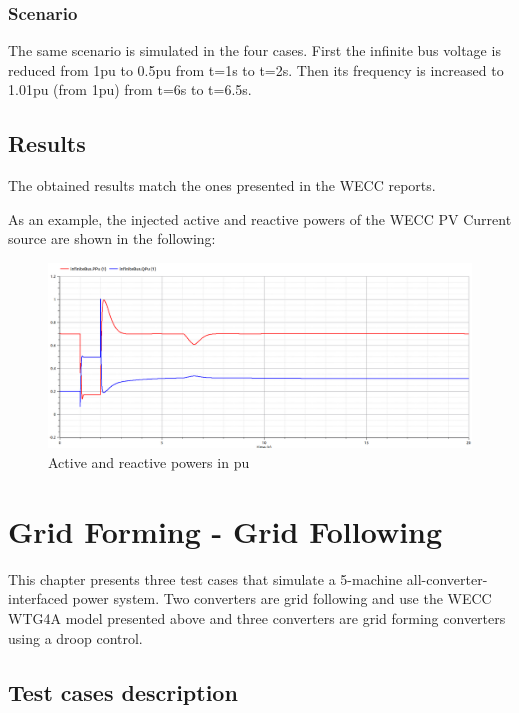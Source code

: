 \documentclass[a4paper, 12pt]{report}
\begin{document}
\subsection{Scenario}

\par The same scenario is simulated in the four cases. First the infinite bus voltage is reduced from 1pu to 0.5pu from t=1s to t=2s. Then its frequency is increased to 1.01pu (from 1pu) from t=6s to t=6.5s.

\section{Results}

\par The obtained results match the ones presented in the WECC reports.

\par As an example, the injected active and reactive powers of the WECC PV Current source are shown in the following:

\begin{figure}[H]
  \includegraphics[width=\textwidth]{PQWECC.png}
  \caption{Active and reactive powers in pu}
\end{figure}


\chapter{Grid Forming - Grid Following}

This chapter presents three test cases that simulate a 5-machine all-converter-interfaced power system.
Two converters are grid following and use the WECC WTG4A model presented above and three converters are grid forming converters using a droop control.

\section{Test cases description}
\end{document}
